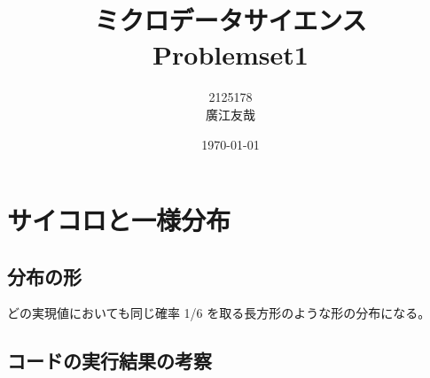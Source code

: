 \documentclass{article}
\begin{document}
\title{ミクロデータサイエンス\\Problemset1}
\author{2125178\\廣江友哉}
\date{\today}
\maketitle


\section{サイコロと一様分布}

\subsection{分布の形}

どの実現値においても同じ確率 1/6 を取る長方形のような形の分布になる。

\subsection{コードの実行結果の考察}
\end{document}
